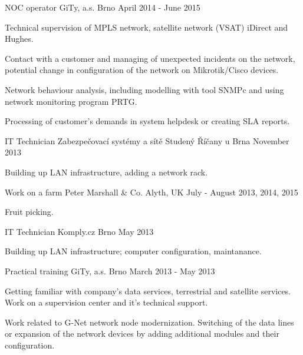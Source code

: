 

\begin{cventries}

  \cventry
    {NOC operator} %
    {GiTy, a.s.} %
    {Brno} %
    {April 2014 - June 2015} %
    {
      \begin{cvitems} %
	\item {Technical supervision of MPLS network, satellite network (VSAT) iDirect and Hughes.}
        \item {Contact with a customer and managing of unexpected incidents on the network, potential change in configuration of the network on Mikrotik/Cisco devices.}     
        \item {Network behaviour analysis, including modelling with tool SNMPc and using network monitoring program PRTG.}     
        \item {Processing of customer's demands in system helpdesk or creating SLA reports.}        
      \end{cvitems}
    }
   \cventry
   {IT Technician}
   {Zabezpečovací systémy a sítě Studený}
   {Říčany u Brna}
   {November 2013}
   {
    \begin{cvitems}
      \item {Building up LAN infrastructure, adding a network rack.}
    \end{cvitems}
   }
   \cventry
   {Work on a farm}
   {Peter Marshall \& Co.}
   {Alyth, UK}
   {July - August 2013, 2014, 2015}
   {
    \begin{cvitems}
      \item {Fruit picking.}
    \end{cvitems}
   }
   \cventry
   {IT Technician}
   {Komply.cz}
   {Brno}
   {May 2013}
   {
    \begin{cvitems}
      \item {Building up LAN infrastructure; computer configuration, maintanance.}
    \end{cvitems}
   }
   \cventry
   {Practical training}
   {GiTy, a.s.}
   {Brno}
   {March 2013 - May 2013}
   {
    \begin{cvitems}
      \item {Getting familiar with company's data services, terrestrial and satellite services. Work on a supervision center and it's technical support.}
      \item {Work related to G-Net network node modernization. Switching of the data lines or expansion of the network devices by adding additional modules and their configuration.}
    \end{cvitems}
   }
   

\end{cventries}
